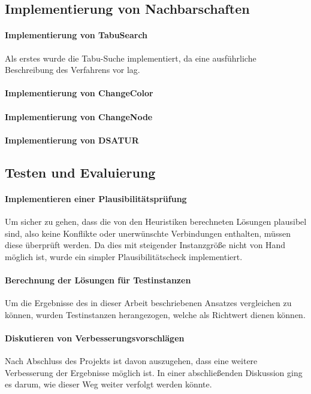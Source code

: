 \subsection{Implementierung von Nachbarschaften}

\paragraph{Implementierung von TabuSearch}{Als erstes wurde die Tabu-Suche implementiert, da eine ausführliche Beschreibung des Verfahrens vor lag.} %
\paragraph{Implementierung von ChangeColor}{} %
\paragraph{Implementierung von ChangeNode}{} %
\paragraph{Implementierung von DSATUR}{}

\subsection{Testen und Evaluierung}

\paragraph{Implementieren einer Plausibilitätsprüfung}{Um sicher zu gehen, dass die von den Heuristiken berechneten Lösungen plausibel sind, also keine Konflikte oder unerwünschte Verbindungen enthalten, müssen diese überprüft werden. Da dies mit steigender Instanzgröße nicht von Hand möglich ist, wurde ein simpler Plausibilitätscheck implementiert.}
\paragraph{Berechnung der Lösungen für Testinstanzen}{Um die Ergebnisse des in dieser Arbeit beschriebenen Ansatzes vergleichen zu können, wurden Testinstanzen herangezogen, welche als Richtwert dienen können.}
\paragraph{Diskutieren von Verbesserungsvorschlägen}{Nach Abschluss des Projekts ist davon auszugehen, dass eine weitere Verbesserung der Ergebnisse möglich ist. In einer abschließenden Diskussion ging es darum, wie dieser Weg weiter verfolgt werden könnte.}

